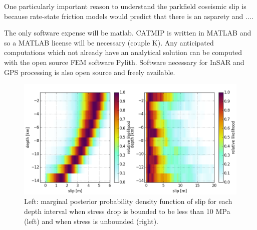 \documentclass[12pt]{article}
\begin{document}
One particularly important reason to understand the parkfield coseismic slip is because rate-state friction models would predict that there is an asparety and ....

The only software expense will be matlab.  CATMIP is written in MATLAB and so a MATLAB license will be necessary (couple K).  Any anticipated computations which not already have an analytical solution can be computed with the open source FEM software Pylith.  Software necessary for InSAR and GPS processing is also open source and freely available.  

\begin{figure}
\includegraphics[width=1.0\textwidth]{figure_2}
\raggedleft
\caption{Left: marginal posterior probability density function of slip for each depth interval when stress drop is bounded to be less than 10 MPa (left) and when stress is unbounded (right).}  
\end{figure}

%


\end{document}
